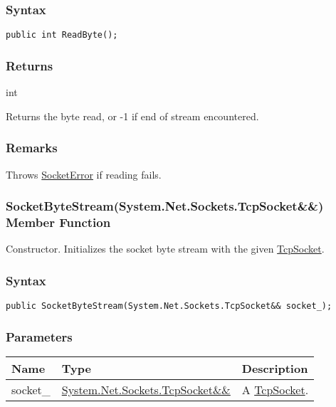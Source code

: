 \documentclass[a4paper,oneside,11.000000pt]{book}
\begin{document}
\subsubsection*{Syntax}\texttt{public int ReadByte();}
\subsubsection*{Returns}
int
\begin{flushleft}
Returns the byte read, or -1 if end of stream encountered.

\end{flushleft}
\subsubsection*{Remarks}
\begin{flushleft}
Throws \hyperlink{System.Net.Sockets.SocketError}{SocketError} if reading fails.

\end{flushleft}
\clearpage

\hypertarget{System.Net.Sockets.SocketByteStream.constructor.P.System.Net.Sockets.SocketByteStream.RR.System.Net.Sockets.TcpSocket}{\subsubsection*{SocketByteStream(System.Net.Sockets.TcpSocket\&\&) Member Function}}
\begin{flushleft}
Constructor. Initializes the socket byte stream with the given \hyperlink{System.Net.Sockets.TcpSocket}{TcpSocket}.

\end{flushleft}
\subsubsection*{Syntax}
\texttt{public SocketByteStream(System.Net.Sockets.TcpSocket\&\& socket\_);}
\subsubsection*{Parameters}
\begin{flushleft}
\begin{supertabular}[l]{!{\raggedright}p{1.43869cm}!{\raggedright}p{8.42798cm}!{\raggedright}p{3.31976cm}}
\textbf{Name}
& \textbf{Type}
& \textbf{Description}
\\
\hline
socket\_
& \hyperlink{System.Net.Sockets.TcpSocket}{System.\-Net.\-Sockets.\-TcpSocket\&\-\&\-}
& A \hyperlink{System.Net.Sockets.TcpSocket}{TcpSocket}.

\\
\end{supertabular}

\end{flushleft}
\clearpage
\end{document}
